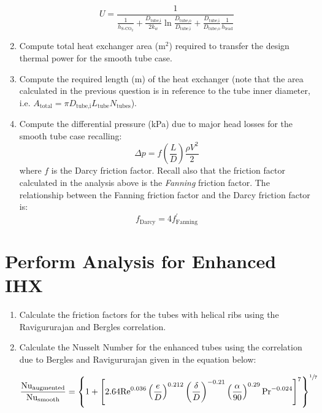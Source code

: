 \begin{fullwidth}
\begin{enumerate}[resume]
$$ U = \frac{1}{\frac{1}{h_{\text{S-CO}_2}} + \frac{D_{\text{tube,i}}}{2k_w} \ln \frac{D_{\text{tube,o}}}{D_{\text{tube,i}}} + \frac{D_{\text{tube,i}}}{D_{\text{tube,o}}} \frac{1}{h_{\text{lead}}}       }$$

\vspace{1.0 cm}

\item Compute total heat exchanger area (m$^2$) required to transfer the design thermal power for the smooth tube case.

\vspace{1.0 cm}

\item Compute the required length (m) of the heat exchanger (note that the area calculated in the previous question is in reference to the tube inner diameter, i.e. $A_{\text{total}} = \pi D_{\text{tube,i}}L_{\text{tube}}N_{\text{tubes}}$).

\vspace{1.0 cm}
\item Compute the differential pressure (kPa) due to major head losses for the smooth tube case recalling:
$$ \Delta p = f \left(\frac{L}{D} \right)\frac{\rho V^2}{2}$$
where $f$ is the Darcy friction factor.  Recall also that the friction factor calculated in the analysis above is the \emph{Fanning} friction factor.  The relationship between the Fanning friction factor and the Darcy friction factor is:
$$f_{\text{Darcy}} = 4 f^{\prime}_{\text{Fanning}}$$

\end{enumerate}

\section{Perform Analysis for Enhanced IHX}

\begin{enumerate}[resume]
\item Calculate the friction factors for the tubes with helical ribs using the Ravigururajan and Bergles correlation.

\vspace{1.0 cm}

\item Calculate the Nusselt Number for the enhanced tubes using the correlation due to Bergles and Ravigururajan given in the equation below:

$$\frac{\text{Nu}_{\text{augmented}}}{\text{Nu}_{\text{smooth}}} = \left\{  1 + \left[2.64\text{Re}^{0.036} \left(\frac{e}{D} \right)^{0.212} \left(\frac{\delta}{D} \right)^{-0.21} \left(\frac{\alpha}{90} \right)^{0.29} \text{Pr}^{-0.024}\right]^{7} \right\}^{\sfrac{1}{7}} $$



\end{enumerate}
\end{fullwidth}
